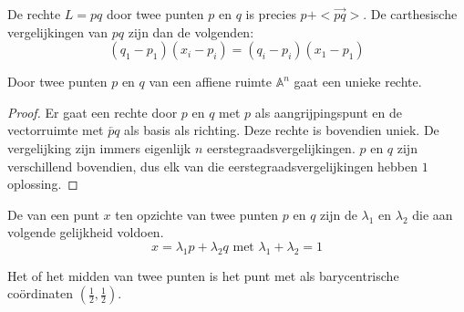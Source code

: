 \documentclass[main.tex]{subfiles}
\begin{document}
\begin{st}
  De rechte $L=pq$ door twee punten $p$ en $q$ is precies $p + <\vec{pq}>$.
  De carthesische vergelijkingen van $pq$ zijn dan de volgenden:
  \[
  (q_{1}-p_{1})(x_{i}-p_{i}) = (q_{i}-p_{i})(x_{1}-p_{1})
  \]
\end{st}


\begin{st}
  \label{st:unieke-rechte-door-twee-punten}
  Door twee punten $p$ en $q$ van een affiene ruimte $\mathbb{A}^{n}$ gaat een unieke rechte.

  \begin{proof}
    Er gaat een rechte door $p$ en $q$ met $p$ als aangrijpingspunt en de vectorruimte met $\overleftarrow{pq}$ als basis als richting.
    Deze rechte is bovendien uniek.
    De vergelijking zijn immers eigenlijk $n$ eerstegraadsvergelijkingen.
    $p$ en $q$ zijn verschillend bovendien, dus elk van die eerstegraadsvergelijkingen hebben $1$ oplossing.
  \end{proof}
\end{st}

\begin{de}
  De  van een punt $x$ ten opzichte van twee punten $p$ en $q$ zijn de $\lambda_{1}$ en $\lambda_{2}$ die aan volgende gelijkheid voldoen.
  \[ x = \lambda_{1}p + \lambda_{2}q \text{ met } \lambda_{1} + \lambda_{2} = 1 \]
\end{de}

\begin{de}
  Het  of het midden van twee punten is het punt met als barycentrische co\"ordinaten $(\frac{1}{2},\frac{1}{2})$.
\end{de}
\end{document}
